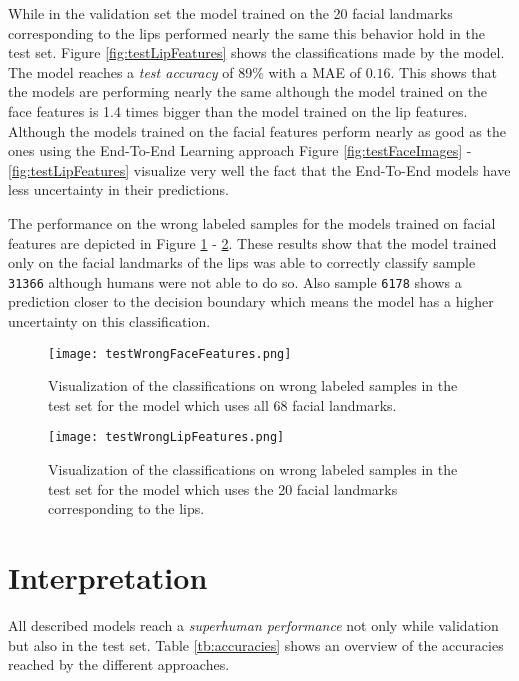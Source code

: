 While in the validation set the model trained on the 20 facial landmarks corresponding to the lips performed nearly the same this behavior hold in the test set.
Figure \ref{fig:testLipFeatures} shows the classifications made by the model.
The model reaches a \emph{test accuracy} of 89\% with a MAE of $0.16$.
This shows that the models are performing nearly the same although the model trained on the face features is 1.4 times bigger than the model trained on the lip features.
Although the models trained on the facial features perform nearly as good as the ones using the End-To-End Learning approach Figure \ref{fig:testFaceImages} - \ref{fig:testLipFeatures} visualize very well the fact that the End-To-End models have less uncertainty in their predictions.

The performance on the wrong labeled samples for the models trained on facial features are depicted in Figure \ref{fig:testWrongFaceFeatures} - \ref{fig:testWrongLipFeatures}.
These results show that the model trained only on the facial landmarks of the lips was able to correctly classify sample \texttt{31366} although humans were not able to do so. 
Also sample \texttt{6178} shows a prediction closer to the decision boundary which means the model has a higher uncertainty on this classification.

\begin{figure}
  \centering
  \texttt{[image: testWrongFaceFeatures.png]}
  \caption{Visualization of the classifications on wrong labeled samples in the test set for the model which uses all 68 facial landmarks.}
  \label{fig:testWrongFaceFeatures}
\end{figure}

\begin{figure}
  \centering
  \texttt{[image: testWrongLipFeatures.png]}
  \caption{Visualization of the classifications on wrong labeled samples in the test set for the model which uses the 20 facial landmarks corresponding to the lips.}
  \label{fig:testWrongLipFeatures}
\end{figure}


\section{Interpretation}\label{sec:interpretation}
All described models reach a \emph{superhuman performance} not only while validation but also in the test set.
Table \ref{tb:accuracies} shows an overview of the accuracies reached by the different approaches.

